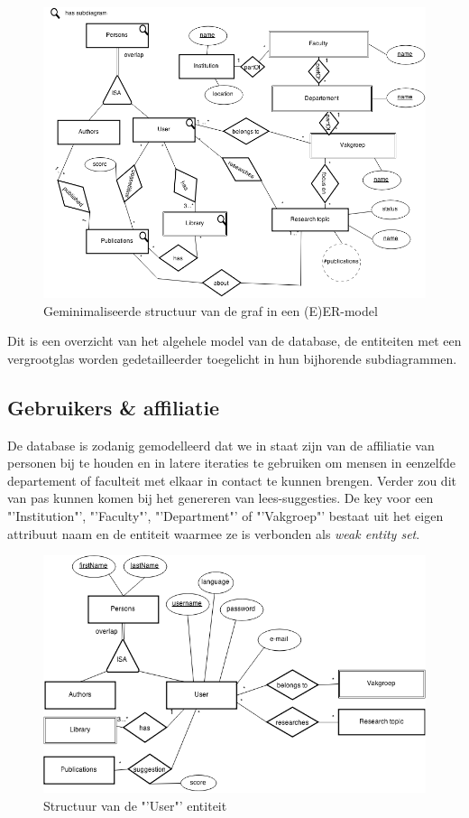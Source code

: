 \documentclass{article}
\begin{document}
\begin{figure}[!h]
\centering
 \includegraphics[width=149mm]{minimised_er_diagram_v3.png}
 \caption{Geminimaliseerde structuur van de graf in een (E)ER-model}
 \label{ER-model}
\end{figure}

Dit is een overzicht van het algehele model van de database, de entiteiten met een vergrootglas worden gedetailleerder toegelicht in hun bijhorende subdiagrammen.\\

\subsection{Gebruikers \& affiliatie}

De database is zodanig gemodelleerd dat we in staat zijn van de affiliatie van personen bij te houden en in latere iteraties te gebruiken om mensen in eenzelfde departement of faculteit met elkaar in contact te kunnen brengen. Verder zou dit van pas kunnen komen bij het genereren van lees-suggesties. De key voor een "'Institution"', "'Faculty"', "'Department"' of "'Vakgroep"' bestaat uit het eigen attribuut naam en de entiteit waarmee ze is verbonden als \textit{weak entity set}.\\

\begin{figure}[!h]
\centering
 \includegraphics[width=145mm]{user_diagram.png}
 \caption{Structuur van de "'User"' entiteit}
 \label{User-model}
\end{figure}
\end{document}

